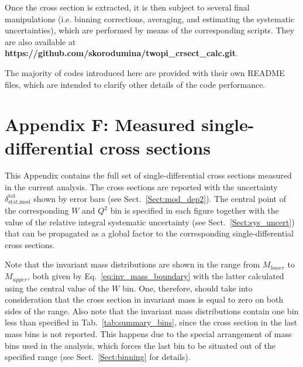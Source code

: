 Once the cross section is extracted, it is then subject to several final manipulations (i.e. binning corrections, averaging, and estimating the systematic uncertainties), which are performed by means of the corresponding scripts. They are also available at {\bf https://github.com/skorodumina/twopi\_crsect\_calc.git}.


The majority of codes introduced here are provided with their own README files, which are intended to clarify other details of the code performance.




\newpage



\renewcommand{\thesection}{F}
    \makeatletter
   \renewcommand{\theequation}{\thesection.\@arabic\c@equation}
    \makeatother
\section*{Appendix F: Measured single-differential cross sections }
\label{app_cr_sect}

This Appendix contains the full set of single-differential cross sections measured in the current analysis. The cross sections are reported with the uncertainty $\delta_{\text{stat,mod}}^{\text{tot}}$ shown by error bars (see Sect.~\ref{Sect:mod_dep2}). The central point of the corresponding $W$ and $Q^{2}$ bin is specified in each figure together with the value of the relative integral systematic uncertainty (see Sect.~\ref{Sect:sys_uncert}) that can be propagated as a global factor to the corresponding single-differential cross sections.

Note that the invariant mass distributions are shown in the range from $M_{lower}$ to $M_{upper}$, both given by Eq.~\eqref{eq:inv_mass_boundary} with the latter calculated using the central value of the $W$ bin. One, therefore, should take into consideration that the cross section in invariant mass is equal to zero on both sides of the range. Also note that the invariant mass distributions contain one bin less than specified in Tab.~\ref{tab:summary_bins}, since the cross section in the last mass bins is not reported. This happens due to the special arrangement of mass bins used in the analysis, which forces the last bin to be situated out of the specified range (see Sect.~\ref{Sect:binning} for details).  


